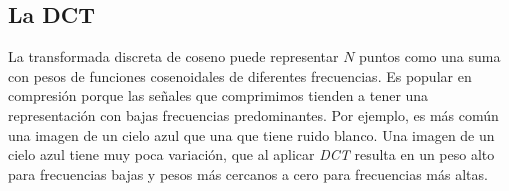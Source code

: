 



\subsection{La DCT}

La transformada discreta de coseno puede representar $N$ puntos como una suma
con pesos de funciones cosenoidales de diferentes frecuencias. Es popular en
compresión porque las señales que comprimimos tienden a tener una
representación con bajas frecuencias predominantes. Por ejemplo, es más común
una imagen de un cielo azul que una que tiene ruido blanco. Una imagen de un
cielo azul tiene muy poca variación, que al aplicar \emph{DCT} resulta en un
peso alto para frecuencias bajas y pesos más cercanos a cero para frecuencias
más altas.

